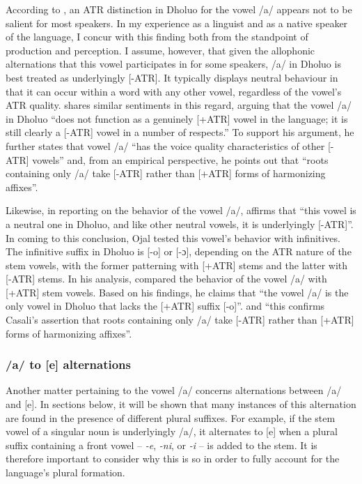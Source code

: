 \documentclass[output=paper,colorlinks,citecolor=brown]{langscibook}
\begin{document}
According to \citet{BorowskyAvery2009}, an ATR distinction in Dholuo for the vowel /a/ appears not to be salient for most speakers. In my experience as a linguist and as a native speaker of the language, I concur with this finding both from the standpoint of production and perception. I assume, however, that given the allophonic alternations that this vowel participates in for some speakers, /a/ in Dholuo is best treated as underlyingly [-ATR]. It typically displays neutral behaviour in that it can occur within a word with any other vowel, regardless of the vowel’s ATR quality. \citet[37--38]{Casali2003} shares similar sentiments in this regard, arguing that the vowel /a/ in Dholuo “does not function as a genuinely [+ATR] vowel in the language; it is still clearly a [-ATR] vowel in a number of respects.” To support his argument, he further states that vowel /a/ ``has the voice quality characteristics of other [-ATR] vowels'' and, from an empirical perspective, he points out that ``roots containing only /a/ take [-ATR] rather than [+ATR] forms of harmonizing affixes''.

Likewise, in reporting on the behavior of the vowel /a/, \citet[80]{Ojal2015} affirms that “this vowel is a neutral one in Dholuo, and like other neutral vowels, it is underlyingly [-ATR]”. In coming to this conclusion, Ojal tested this vowel's behavior with infinitives. The infinitive suffix in Dholuo is [-o] or [-ɔ], depending on the ATR nature of the stem vowels, with the former patterning with [+ATR] stems and the latter with [-ATR] stems. In his analysis, \citet[79]{Ojal2015} compared the behavior of the vowel /a/ with [+ATR] stem vowels. Based on his findings, he claims that “the vowel /a/ is the only vowel in Dholuo that lacks the [+ATR] suffix [-o]”. and “this confirms Casali’s assertion that roots containing only /a/ take [-ATR] rather than [+ATR] forms of harmonizing affixes”.

\subsubsection{/a/ to [e] alternations}

Another matter pertaining to the vowel /a/ concerns alternations between /a/ and [e]. In sections below, it will be shown that many instances of this alternation are found in the presence of different plural suffixes. For example, if the stem vowel of a singular noun is underlyingly /a/, it alternates to [e] when a plural suffix containing a front vowel -- \textit{-e}, \textit{-ni}, or \textit{-i} -- is added to the stem. It is therefore important to consider why this is so in order to fully account for the language's plural formation. 
\end{document}

